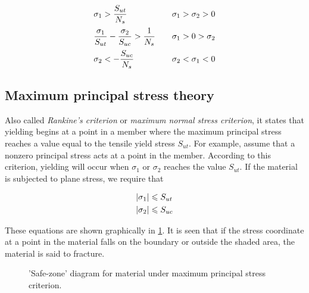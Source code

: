 \documentclass[
10pt,
a4paper,
openany,
svgnames,
]{book}
\begin{document}
\begin{equation}
  \begin{array}{l l l}
  \sigma_1 > \dfrac{S_{ut}}{N_s} & & \sigma_1 > \sigma_2 > 0 \\[10pt]
  \dfrac{\sigma_1}{S_{ut}} - \dfrac{\sigma_2}{S_{uc}} > \dfrac{1}{N_s} & & \sigma_1 > 0 > \sigma_2 \\[10pt]
    \sigma_2 <  -\dfrac{S_{uc}}{N_s} & & \sigma_2 < \sigma_1 < 0
  \end{array}
\end{equation}

\subsection{Maximum principal stress theory}

Also called \emph{Rankine’s criterion} or \emph{maximum normal stress criterion}, it states that yielding begins at a point in a member where the maximum principal stress reaches a value equal to the tensile yield stress $S_{ut}$. For example, assume that a nonzero principal stress acts at a point in the member. According to this criterion, yielding will occur when $\sigma_1$ or $\sigma_2$ reaches the value $S_{ut}$. If the material is subjected to plane stress, we require that

\[\begin{gathered}
    \left| \sigma _1 \right| \leqslant S_{ut} \hfill \\
    \left| \sigma _2 \right| \leqslant S_{uc} \hfill \\ 
  \end{gathered} \]

These equations are shown graphically in \cref{fig: MNST safe zone}. It is seen that if the stress coordinate at a point in the material falls on the boundary or outside the shaded area, the material is said to fracture.

\begin{figure}[h]
  \centering
  \caption{'Safe-zone' diagram for material under maximum principal stress criterion.}
  \label{fig: MNST safe zone}
\end{figure}
\end{document}
